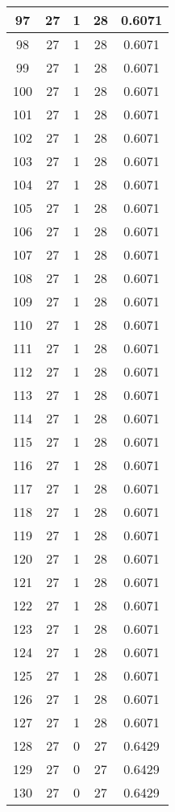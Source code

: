 \documentclass[letterpaper, 12pt]{article}
\begin{document}
\begin{longtable}{|c|c|c|c|c|}
\hline
97 & 27 & 1 & 28 & 0.6071 \\
\hline
98 & 27 & 1 & 28 & 0.6071 \\
\hline
99 & 27 & 1 & 28 & 0.6071 \\
\hline
100 & 27 & 1 & 28 & 0.6071 \\
\hline
101 & 27 & 1 & 28 & 0.6071 \\
\hline
102 & 27 & 1 & 28 & 0.6071 \\
\hline
103 & 27 & 1 & 28 & 0.6071 \\
\hline
104 & 27 & 1 & 28 & 0.6071 \\
\hline
105 & 27 & 1 & 28 & 0.6071 \\
\hline
106 & 27 & 1 & 28 & 0.6071 \\
\hline
107 & 27 & 1 & 28 & 0.6071 \\
\hline
108 & 27 & 1 & 28 & 0.6071 \\
\hline
109 & 27 & 1 & 28 & 0.6071 \\
\hline
110 & 27 & 1 & 28 & 0.6071 \\
\hline
111 & 27 & 1 & 28 & 0.6071 \\
\hline
112 & 27 & 1 & 28 & 0.6071 \\
\hline
113 & 27 & 1 & 28 & 0.6071 \\
\hline
114 & 27 & 1 & 28 & 0.6071 \\
\hline
115 & 27 & 1 & 28 & 0.6071 \\
\hline
116 & 27 & 1 & 28 & 0.6071 \\
\hline
117 & 27 & 1 & 28 & 0.6071 \\
\hline
118 & 27 & 1 & 28 & 0.6071 \\
\hline
119 & 27 & 1 & 28 & 0.6071 \\
\hline
120 & 27 & 1 & 28 & 0.6071 \\
\hline
121 & 27 & 1 & 28 & 0.6071 \\
\hline
122 & 27 & 1 & 28 & 0.6071 \\
\hline
123 & 27 & 1 & 28 & 0.6071 \\
\hline
124 & 27 & 1 & 28 & 0.6071 \\
\hline
125 & 27 & 1 & 28 & 0.6071 \\
\hline
126 & 27 & 1 & 28 & 0.6071 \\
\hline
127 & 27 & 1 & 28 & 0.6071 \\
\hline
128 & 27 & 0 & 27 & 0.6429 \\
\hline
129 & 27 & 0 & 27 & 0.6429 \\
\hline
130 & 27 & 0 & 27 & 0.6429 \\

\end{longtable}
\end{document}
